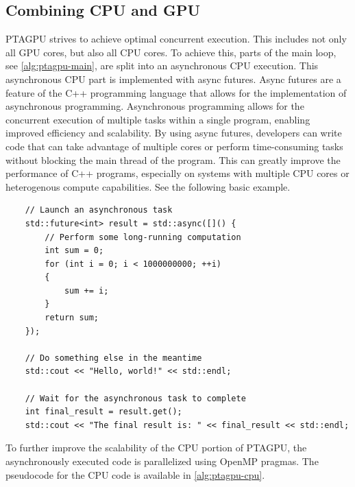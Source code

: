 \subsection{Combining CPU and GPU}\label{sec:cpugpu}
PTAGPU strives to achieve optimal concurrent execution.
This includes not only all GPU cores, but also all CPU cores.
To achieve this, parts of the main loop, see \autoref{alg:ptagpu-main}, are split into an asynchronous CPU execution.
This asynchronous CPU part is implemented with async futures.
Async futures are a feature of the C++ programming language that allows for the implementation of asynchronous programming. Asynchronous programming allows for the concurrent execution of multiple tasks within a single program, enabling improved efficiency and scalability. By using async futures, developers can write code that can take advantage of multiple cores or perform time-consuming tasks without blocking the main thread of the program. This can greatly improve the performance of C++ programs, especially on systems with multiple CPU cores or heterogenous compute capabilities. See the following basic example.
\begin{verbatim}
    // Launch an asynchronous task
    std::future<int> result = std::async([]() {
        // Perform some long-running computation
        int sum = 0;
        for (int i = 0; i < 1000000000; ++i)
        {
            sum += i;
        }
        return sum;
    });

    // Do something else in the meantime
    std::cout << "Hello, world!" << std::endl;

    // Wait for the asynchronous task to complete
    int final_result = result.get();
    std::cout << "The final result is: " << final_result << std::endl;
\end{verbatim}
To further improve the scalability of the CPU portion of PTAGPU, the asynchronously executed code is parallelized using OpenMP pragmas.
The pseudocode for the CPU code is available in \autoref{alg:ptagpu-cpu}.
